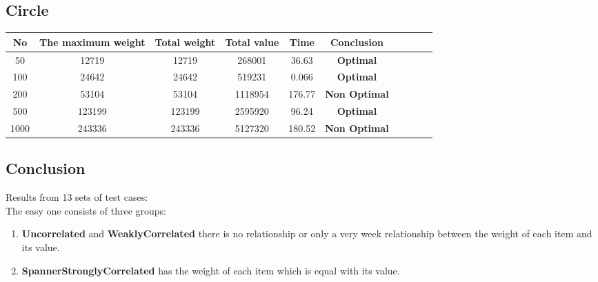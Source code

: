 \documentclass{article}
\begin{document}
\subsection{Circle}
    \begin{center}
        \begin{tabular}{|c|c| c|c| c|c| c|c| c|c|}
        \hline
            No& The maximum weight & Total weight & Total value& Time&Conclusion \\
        \hline
            50 & 12719 & 12719 & 268001 & 36.63 & \textbf{Optimal}\\
            100 & 24642 & 24642 & 519231 & 0.066 & \textbf{Optimal}\\
            200 & 53104 & 53104 & 1118954 & 176.77 & \textbf{Non Optimal}\\
            500 & 123199 & 123199 & 2595920 & 96.24 & \textbf{Optimal}\\
            1000 & 243336 & 243336 & 5127320 & 180.52 & \textbf{Non Optimal}\\
    \hline
        \hline 
        \end{tabular}
    \end{center}
    


\subsection{Conclusion}
Results from 13 sets of test cases:\\

The easy one consists of three groups:

\begin{enumerate}
    \item \textbf{Uncorrelated} and \textbf{WeaklyCorrelated} there is no relationship or only a very week relationship between the weight of each item and its value.
    \item \textbf{SpannerStronglyCorrelated} has the weight of each item which is equal with its value.
\end{enumerate}
\end{document}

